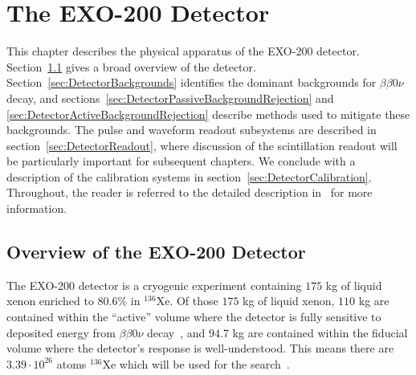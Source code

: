 \renewcommand{\thechapter}{3}
\chapter{The EXO-200 Detector}
\label{ch:EXO200Detector}

This chapter describes the physical apparatus of the EXO-200 detector.  Section~\ref{sec:DetectorOverview} gives a broad overview of the detector.  Section~\ref{sec:DetectorBackgrounds} identifies the dominant backgrounds for $\beta\beta 0\nu$ decay, and sections~\ref{sec:DetectorPassiveBackgroundRejection} and \ref{sec:DetectorActiveBackgroundRejection} describe methods used to mitigate these backgrounds.  The pulse and waveform readout subsystems are described in section~\ref{sec:DetectorReadout}, where discussion of the scintillation readout will be particularly important for subsequent chapters.  We conclude with a description of the calibration systems in section~\ref{sec:DetectorCalibration}.  Throughout, the reader is referred to the detailed description in~\cite{detectorPartI} for more information.

\section{Overview of the EXO-200 Detector}\label{sec:DetectorOverview}

The EXO-200 detector is a cryogenic experiment containing $175$ kg of liquid xenon enriched to $80.6\%$ in $^{136}$Xe.  Of those $175$ kg of liquid xenon, $110$ kg are contained within the ``active'' volume where the detector is fully sensitive to deposited energy from $\beta\beta 0\nu$ decay~\cite{detectorPartI}, and $94.7$ kg are contained within the fiducial volume where the detector's response is well-understood.  This means there are $3.39 \cdot 10^{26}$ atoms $^{136}$Xe which will be used for the search~\cite{NewEXObb0nPaper_2014}.


